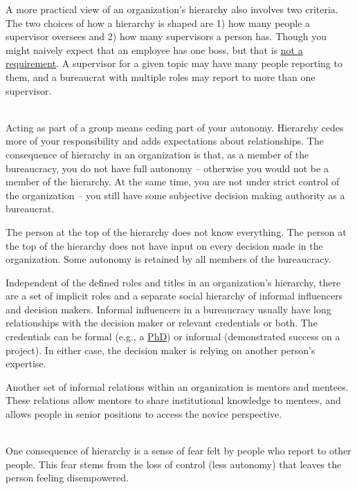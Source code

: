A more practical view of an organization's hierarchy also involves two criteria. The two choices of how a hierarchy is shaped are 
1) how many people a supervisor oversees and 
2) how many supervisors a person has. 
Though you might naively expect that an employee has one boss, but that is \href{https://en.wikipedia.org/wiki/Matrix_management}{not a requirement}. A supervisor for a given topic may have many people reporting to them, and a bureaucrat with multiple roles may report to more than one supervisor.

\ \\

Acting as part of a group means ceding part of your autonomy. Hierarchy cedes more of your responsibility and adds expectations about relationships.
The consequence of hierarchy in an organization is that, as a member of the bureaucracy, you do not have full autonomy -- otherwise you would not be a member of the hierarchy. At the same time, you are not under strict control of the organization -- you still have some subjective decision making authority as a bureaucrat.

The person at the top of the hierarchy does not know everything. The person at the top of the hierarchy does not have input on every decision made in the organization. Some autonomy is retained by all members of the bureaucracy.

Independent of the defined roles and titles in an organization's hierarchy, there are a set of implicit roles and a separate social hierarchy of informal influencers and decision makers. Informal influencers in a bureaucracy usually have long relationships with the decision maker or relevant credentials or both. The credentials can be formal (e.g., a \href{https://en.wikipedia.org/wiki/Doctor_of_Philosophy}{PhD}) or informal (demonstrated success on a project). In either case, the decision maker is relying on another person's expertise. 

Another set of informal relations within an organization is mentors and mentees. These relations allow mentors to share institutional knowledge to mentees, and allows people in senior positions to access the novice perspective. 


\ \\

One consequence of hierarchy is a sense of fear felt by people who report to other people. This fear stems from the loss of control (less autonomy) that leaves the person feeling disempowered. 

